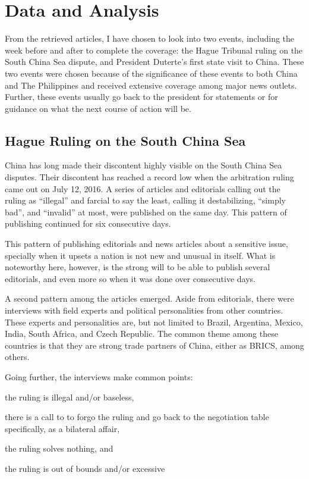 \section{Data and Analysis}\label{sec:data}

From the retrieved articles, I have chosen to look into two events,
including the week before and after to complete the coverage: the Hague
Tribunal ruling on the South China Sea dispute, and President Duterte's
first state visit to China. These two events were chosen because of the
significance of these events to both China and The Philippines and
received extensive coverage among major news outlets. Further, these
events usually go back to the president for statements or for guidance
on what the next course of action will be.

\subsection{Hague Ruling on the South China Sea}

China has long made their discontent highly visible on the South China
Sea
disputes\autocites{sun_new_philippine_president_ties_2016}{li_end_scs_farce_2016}{xinhua_us_cold_war_not_solution_2016}.
Their discontent has reached a record low when the arbitration ruling
came out on July 12, 2016. A series of articles and editorials calling
out the ruling as ``illegal'' and farcial to say the least, calling it
destabilizing, ``simply bad'', and ``invalid'' at most, were published
on the same day. This pattern of publishing continued for six
consecutive days.

This pattern of publishing editorials and news articles about a
sensitive issue, specially when it upsets a nation is not new and
unusual in itself. What is noteworthy here, however, is the strong will
to be able to publish several editorials, and even more so when it was
done over consecutive days.

A second pattern among the articles emerged. Aside from editorials,
there were interviews with field experts and political personalities
from other countries. These experts and personalities are, but not
limited to Brazil, Argentina, Mexico, India, South Africa, and Czech
Republic. The common theme among these countries is that they are
strong trade partners of China, either as BRICS, among others.

Going further, the interviews make common points:
\begin{enumerate*}[label={\alph*}.)]
	\item the ruling is illegal and/or baseless,
	\item there is a call to to forgo the ruling and go
	back to the negotiation table specifically, as a bilateral
	affair,
	\item the ruling solves nothing, and
	\item the ruling is out of bounds and/or excessive
\end{enumerate*}

